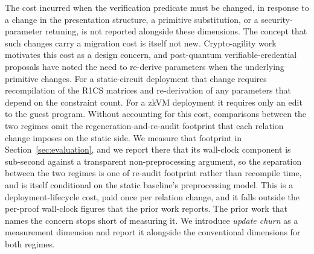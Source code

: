 The cost incurred when the verification predicate must be changed, in response to a change in the presentation structure, a primitive substitution, or a security-parameter retuning, is not reported alongside these dimensions. The concept that such changes carry a migration cost is itself not new. Crypto-agility work~\cite{ott2019cryptoagility} motivates this cost as a design concern, and post-quantum verifiable-credential proposals have noted the need to re-derive parameters when the underlying primitive changes.
For a static-circuit deployment that change requires recompilation of the R1CS matrices and re-derivation of any parameters that depend on the constraint count. For a zkVM deployment it requires only an edit to the guest program. Without accounting for this cost, comparisons between the two regimes omit the regeneration-and-re-audit footprint that each relation change imposes on the static side. We measure that footprint in Section~\ref{sec:evaluation}, and we report there that its wall-clock component is sub-second against a transparent non-preprocessing argument, so the separation between the two regimes is one of re-audit footprint rather than recompile time, and is itself conditional on the static baseline's preprocessing model. This is a deployment-lifecycle cost, paid once per relation change, and it falls outside the per-proof wall-clock figures that the prior work reports. The prior work that names the concern stops short of measuring it. We introduce \emph{update churn} as a measurement dimension and report it alongside the conventional dimensions for both regimes.

